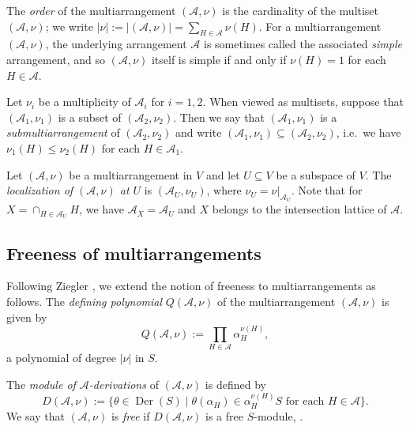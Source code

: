 The \emph{order} of the multiarrangement $({{\mathcal A}}, \nu)$ 
is the cardinality 
of the multiset $({{\mathcal A}}, \nu)$; we write 
$|\nu| := |({{\mathcal A}}, \nu)| = \sum_{H \in {{\mathcal A}}} \nu(H)$.
For a multiarrangement $({{\mathcal A}}, \nu)$, the underlying 
arrangement ${{\mathcal A}}$ is sometimes called the associated 
\emph{simple} arrangement, and so $({{\mathcal A}}, \nu)$ itself is  
simple if and only if $\nu(H) = 1$ for each $H \in {{\mathcal A}}$. 

\begin{defn}
\label{def:submulti}
Let $\nu_i$ be a multiplicity of ${{\mathcal A}}_i$ for $ i = 1,2$.
When viewed as multisets, suppose that 
$({{\mathcal A}}_1, \nu_1)$ is a subset of $({{\mathcal A}}_2, \nu_2)$.
Then we say that $({{\mathcal A}}_1, \nu_1)$ is a 
\emph{submultiarrangement} of $({{\mathcal A}}_2, \nu_2)$ and write 
$({{\mathcal A}}_1, \nu_1) \subseteq ({{\mathcal A}}_2, \nu_2)$,
i.e.\ we have $\nu_1(H) \le \nu_2(H)$ for each $H \in {{\mathcal A}}_1$.
\end{defn}

\begin{defn}
\label{def:localization}
Let $({{\mathcal A}}, \nu)$ be a multiarrangement in $V$ and let 
$U \subseteq V$ be a subspace of $V$. The 
\emph{localization of $({{\mathcal A}}, \nu)$ at $U$} is $({{\mathcal A}}_U, \nu_U)$,
where $\nu_U = \nu |_{{{\mathcal A}}_U}$.
Note that for $X = \cap_{H \in {{\mathcal A}}_U} H$, we have 
${{\mathcal A}}_X = {{\mathcal A}}_U$ and $X$ belongs to the 
intersection lattice of ${{\mathcal A}}$. 
\end{defn}

\subsection{Freeness of  multiarrangements}

Following Ziegler \cite{ziegler:multiarrangements},
we extend the notion of freeness to multiarrangements as follows.
The \emph{defining polynomial} $Q({{\mathcal A}}, \nu)$ 
of the multiarrangement $({{\mathcal A}}, \nu)$ is given by 
\[
Q({{\mathcal A}}, \nu) := \prod_{H \in {{\mathcal A}}} \alpha_H^{\nu(H)},
\] 
a polynomial of degree $|\nu|$ in $S$.

The \emph{module of ${{\mathcal A}}$-derivations} of $({{\mathcal A}}, \nu)$ is 
defined by 
\[
D({{\mathcal A}}, \nu) := \{\theta \in {{\operatorname{Der}}}(S) \mid \theta(\alpha_H) \in \alpha_H^{\nu(H)} S 
\text{ for each } H \in {{\mathcal A}}\}.
\]
We say that $({{\mathcal A}}, \nu)$ is \emph{free} if 
$D({{\mathcal A}}, \nu)$ is a free $S$-module, 
\cite[Def.\ 6]{ziegler:multiarrangements}.

